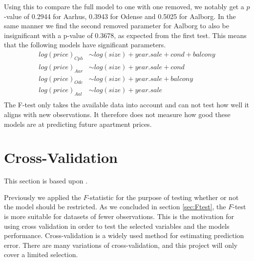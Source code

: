 Using this to compare the full model to one with one removed, we notably get a $p$-value of 0.2944 for Aarhus, 0.3943 for Odense and 0.5025 for Aalborg. 
In the same manner we find the second removed parameter for Aalborg to also be insignificant with a p-value of 0.3678, as expected from the first test.
This means that the following models have significant parameters.
\begin{align*}
    log(price)_{Cph} &\sim log(size) + year.sale + cond + balcony \\
    log(price)_{Aar} &\sim log(size) + year.sale + cond \\
    log(price)_{Ode} &\sim log(size) + year.sale + balcony \\
    log(price)_{Aal} &\sim log(size) + year.sale \\
\end{align*}
The F-test only takes the available data into account and can not test how well it aligns with new observations.
It therefore does not measure how good these models are at predicting future apartment prices.



    
    
    

\section{Cross-Validation}
This section is based upon \cite{Hastie2008}.

Previously we applied the $F$-statistic for the purpose of testing whether or not the model should be restricted. 
As we concluded in section \ref{sec:Ftest}, the $F$-test is more suitable for datasets of fewer observations. 
This is the motivation for using cross validation in order to test the selected variables and the models performance.
Cross-validation is a widely used method for estimating prediction error.
There are many variations of cross-validation, and this project will only cover a limited selection. 

